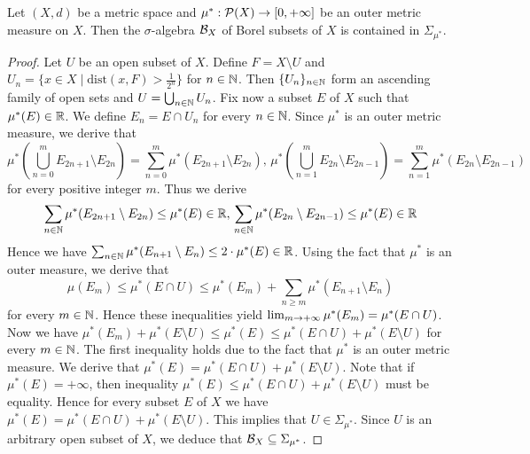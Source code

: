 \begin{theorem}
Let $(X,d)$ be a metric space and $\mu^*:{\mathcal P}(X)\rightarrow [0,+\infty]$ be an outer metric measure on $X$. Then the $\sigma$-algebra ${\mathcal B}_X$ of Borel subsets of $X$ is contained in $\Sigma_{\mu^*}$.
\end{theorem}
\begin{proof}
Let $U$ be an open subset of $X$. Define $F=X\setminus U$ and $U_n=\{x\in X\mid \mathrm{dist}(x,F)>\frac{1}{2^n}\}$ for $n\in {\mathbb N}$. Then $\{U_n\}_{n\in {\mathbb N}}$ form an ascending family of open sets and $U=\bigcup_{n\in {\mathbb N}}U_n$. Fix now a subset $E$ of $X$ such that $\mu^*(E)\in {\mathbb R}$. We define $E_n=E\cap U_n$ for every $n\in {\mathbb N}$. Since $\mu^*$ is an outer metric measure, we derive that
$$\mu^*\left(\bigcup_{n=0}^mE_{2n+1}\setminus E_{2n}\right)=\sum_{n=0}^m\mu^*(E_{2n+1}\setminus E_{2n}),\,\mu^*\left(\bigcup_{n=1}^mE_{2n}\setminus E_{2n-1}\right)=\sum_{n=1}^m\mu^*(E_{2n}\setminus E_{2n-1})$$
for every positive integer $m$. Thus we derive 
$$\sum_{n\in {\mathbb N}}\mu^*(E_{2n+1}\setminus E_{2n})\leq \mu^*(E)\in {\mathbb R},\,\sum_{n\in {\mathbb N}}\mu^*(E_{2n}\setminus E_{2n-1})\leq \mu^*(E)\in {\mathbb R}$$
Hence we have $\sum_{n\in {\mathbb N}}\mu^*(E_{n+1}\setminus E_{n})\leq 2\cdot \mu^*(E)\in {\mathbb R}$. Using the fact that $\mu^*$ is an outer measure, we derive that
$$\mu(E_m)\leq \mu^*(E\cap U)\leq \mu^*(E_m)+\sum_{n\geq m}\mu^*(E_{n+1}\setminus E_n)$$
for every $m\in {\mathbb N}$. Hence these inequalities yield $\lim_{m\rightarrow +\infty}\mu^*(E_m)=\mu^*(E\cap U)$. Now we have $\mu^*(E_m)+\mu^*(E\setminus U)\leq \mu^*(E)\leq \mu^*(E\cap U)+\mu^*(E\setminus U)$ for every $m\in {\mathbb N}$. The first inequality holds due to the fact that $\mu^*$ is an outer metric measure. We derive that $\mu^*(E)=\mu^*(E\cap U)+\mu^*(E\setminus U)$. Note that if $\mu^*(E)=+\infty$, then inequality $\mu^*(E)\leq \mu^*(E\cap U)+\mu^*(E\setminus U)$ must be equality. Hence for every subset $E$ of $X$ we have $\mu^*(E)=\mu^*(E\cap U)+\mu^*(E\setminus U)$. This implies that $U\in \Sigma_{\mu^*}$. Since $U$ is an arbitrary open subset of $X$, we deduce that ${\mathcal B}_X\subseteq \Sigma_{\mu^*}$.
\end{proof}


























































\small






